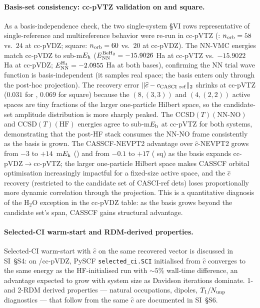\documentclass[journal=jctcce,manuscript=article,layout=traditional]{achemso}
\begin{document}
\paragraph{Basis-set consistency: cc-pVTZ validation on 
and  square.} As a basis-independence check, the two
single-system §VI rows representative of single-reference and
multireference behavior were re-run in cc-pVTZ
(: $n_{\rm orb}=58$ vs.\ $24$ at cc-pVDZ;
 square: $n_{\rm orb}=60$ vs.\ $20$ at cc-pVDZ).
The NN-VMC energies match cc-pVDZ to sub-m$E_{\rm h}$
($E_{\rm NN}^{\rm BeH_2}=-15.9026$ Ha at cc-pVTZ vs.\ $-15.9022$
Ha at cc-pVDZ; $E_{\rm NN}^{\rm H_4} = -2.0955$ Ha at both bases),
confirming the NN trial wave function is basis-independent (it
samples real space; the basis enters only through the post-hoc
projection). The recovery error
$\|\widehat c - c_{\rm CASCI~ref}\|_2$ shrinks at cc-pVTZ
($0.031$ for , $0.069$ for  square) because the
$(8,(3,3))$ and $(4,(2,2))$ active spaces are tiny fractions of the
larger one-particle Hilbert space, so the candidate-set
amplitude distribution is more sharply peaked. The
CCSD$(T)(\text{NN-NO})$ and CCSD$(T)(\text{HF})$ energies agree to
sub-m$E_{\rm h}$ at cc-pVTZ for both systems, demonstrating
that the post-HF stack consumes the NN-NO frame consistently as
the basis is grown. The CASSCF-NEVPT2 advantage over
$\widehat c$-NEVPT2 grows from $-3$ to $+14$~m$E_{\rm h}$
() and from $-0.1$ to $+17$ ( sq) as the basis
expands cc-pVDZ$\to$cc-pVTZ; the larger one-particle Hilbert space
makes CASSCF orbital optimisation increasingly impactful for a
fixed-size active space, and the $\widehat c$ recovery
(restricted to the candidate set of CASCI-ref dets) loses
proportionally more dynamic correlation through the projection.
This is a quantitative diagnosis of the H$_2$O exception in the
cc-pVDZ table: as the basis grows beyond the candidate set's
span, CASSCF gains structural advantage.

\paragraph{Selected-CI warm-start and RDM-derived properties.}
Selected-CI warm-start with $\widehat c$ on the same recovered
vector is discussed in SI~\S S4: on
/cc-pVDZ, PySCF \texttt{selected\_ci.SCI} initialised from
$\widehat c$ converges to the same energy as the HF-initialised run
with $\sim 5\%$ wall-time difference, an advantage expected to grow
with system size as Davidson iterations dominate. 1- and 2-RDM
derived properties --- natural occupations, dipoles,
$T_1/N_{\rm unp}$ diagnostics --- that follow from the same
$\widehat c$ are documented in SI~\S S6.
\end{document}
